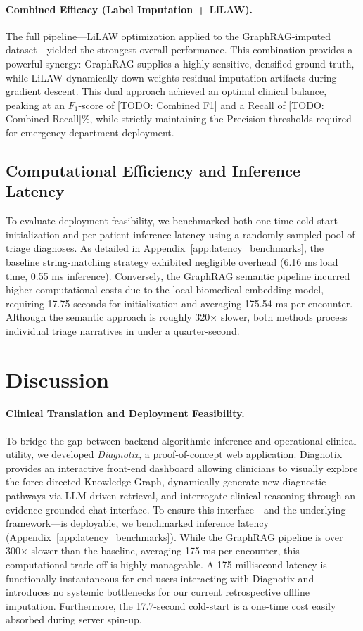 \documentclass[pmlr]{jmlr}%
\begin{document}
\paragraph{Combined Efficacy (Label Imputation + LiLAW).}
The full pipeline—LiLAW optimization applied to the GraphRAG-imputed dataset—yielded the strongest overall performance. This combination provides a powerful synergy: GraphRAG supplies a highly sensitive, densified ground truth, while LiLAW dynamically down-weights residual imputation artifacts during gradient descent. This dual approach achieved an optimal clinical balance, peaking at an $F_1$-score of [TODO: Combined F1] and a Recall of [TODO: Combined Recall]\%, while strictly maintaining the Precision thresholds required for emergency department deployment.

\subsection{Computational Efficiency and Inference Latency}
To evaluate deployment feasibility, we benchmarked both one-time cold-start initialization and per-patient inference latency using a randomly sampled pool of triage diagnoses. As detailed in Appendix~\ref{app:latency_benchmarks}, the baseline string-matching strategy exhibited negligible overhead (6.16 ms load time, 0.55 ms inference). Conversely, the GraphRAG semantic pipeline incurred higher computational costs due to the local biomedical embedding model, requiring 17.75 seconds for initialization and averaging 175.54 ms per encounter. Although the semantic approach is roughly 320$\times$ slower, both methods process individual triage narratives in under a quarter-second.

\section{Discussion}

\paragraph{Clinical Translation and Deployment Feasibility.}
To bridge the gap between backend algorithmic inference and operational clinical utility, we developed \textit{Diagnotix}, a proof-of-concept web application. Diagnotix provides an interactive front-end dashboard allowing clinicians to visually explore the force-directed Knowledge Graph, dynamically generate new diagnostic pathways via LLM-driven retrieval, and interrogate clinical reasoning through an evidence-grounded chat interface. To ensure this interface—and the underlying framework—is deployable, we benchmarked inference latency (Appendix~\ref{app:latency_benchmarks}). While the GraphRAG pipeline is over 300$\times$ slower than the baseline, averaging 175 ms per encounter, this computational trade-off is highly manageable. A 175-millisecond latency is functionally instantaneous for end-users interacting with Diagnotix and introduces no systemic bottlenecks for our current retrospective offline imputation. Furthermore, the 17.7-second cold-start is a one-time cost easily absorbed during server spin-up.
\end{document}
